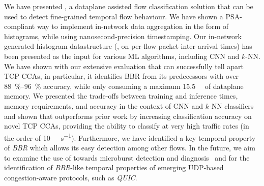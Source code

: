 We have presented \seidr{}, a dataplane assisted flow classification solution that can be used to detect fine-grained temporal flow behaviour. We have shown a PSA-compliant way to implement in-network data aggregation in the form of histograms, while using nanosecond-precision timestamping. Our in-network generated histogram datastructure (\eg, on per-flow packet inter-arrival times) has been presented as the input for various ML algorithms, including CNN and $k$-NN. We have shown with our extensive evaluation that \seidr{} can successfully tell apart TCP CCAs, in particular, it identifies BBR from its predecessors with over \SIrange{88}{96}{\percent} accuracy, while only consuming a maximum \SI{15.5}{\mebi\byte} of dataplane memory. We presented the trade-offs between training and inference times, memory requirements, and accuracy in the context of CNN and $k$-NN classifiers and shown that \seidr{} outperforms prior work by increasing classification accuracy on novel TCP CCAs, providing the ability to classify at very high traffic rates (in the order of \SI{10}{\tera\bit\per\second}).
Furthermore, we have identified a key temporal property of \emph{BBR} which allows its easy detection among other flows.
In the future, we aim to examine the use of \seidr{} towards microburst detection and diagnosis~\cite{DBLP:conf/sigcomm/ChenFKRR18} and for the identification of \emph{BBR}-like temporal properties of emerging UDP-based congestion-aware protocols, such as \emph{QUIC}.%